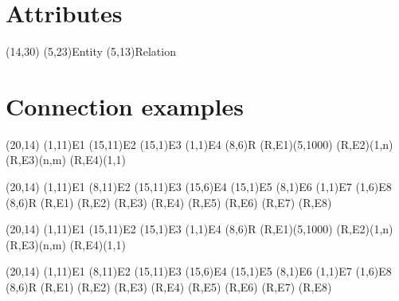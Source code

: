 \documentclass[a4paper,11pt]{article}
\begin{document}
\section{Attributes}

\begin{schema}(14,30)
  \entity[entity](5,23){Entity}
  \relation[relation](5,13){Relation}
\end{schema}


\section{Connection examples}

\begin{schema}(20,14)
  \entity(1,11){E1}
  \entity(15,11){E2}
  \entity(15,1){E3}
  \entity(1,1){E4}
  \relation(8,6){R}
  \connection(R,E1){(5,1000)}
  \connection(R,E2){(1,n)}
  \connection(R,E3){(n,m)}
  \connection(R,E4){(1,1)}
\end{schema}

\begin{schema}(20,14)
  \entity(1,11){E1}
  \entity(8,11){E2}
  \entity(15,11){E3}
  \entity(15,6){E4}
  \entity(15,1){E5}
  \entity(8,1){E6}
  \entity(1,1){E7}
  \entity(1,6){E8}
  \relation(8,6){R}
  \connection(R,E1){}
  \connection(R,E2){}
  \connection(R,E3){}
  \connection(R,E4){}
  \connection(R,E5){}
  \connection(R,E6){}
  \connection(R,E7){}
  \connection(R,E8){}
\end{schema}

\begin{schema}(20,14)
  \entity(1,11){E1}
  \entity(15,11){E2}
  \entity(15,1){E3}
  \entity(1,1){E4}
  \relation(8,6){R}
  \conn(R,E1){(5,1000)}
  \conn(R,E2){(1,n)}
  \conn(R,E3){(n,m)}
  \conn(R,E4){(1,1)}
\end{schema}

\begin{schema}(20,14)
  \entity(1,11){E1}
  \entity(8,11){E2}
  \entity(15,11){E3}
  \entity(15,6){E4}
  \entity(15,1){E5}
  \entity(8,1){E6}
  \entity(1,1){E7}
  \entity(1,6){E8}
  \relation(8,6){R}
  \conn(R,E1){}
  \conn(R,E2){}
  \conn(R,E3){}
  \conn(R,E4){}
  \conn(R,E5){}
  \conn(R,E6){}
  \conn(R,E7){}
  \conn(R,E8){}
\end{schema}
\end{document}
